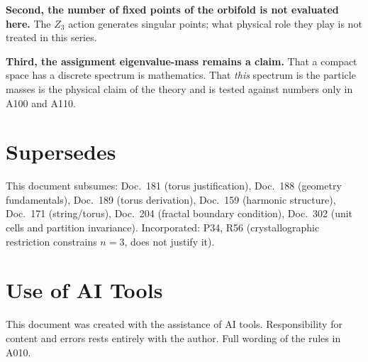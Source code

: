 \textbf{Second, the number of fixed points of the orbifold is not evaluated
here.} The $Z_3$ action generates singular points; what physical role they
play is not treated in this series.

\textbf{Third, the assignment eigenvalue-mass remains a claim.} That a compact
space has a discrete spectrum is mathematics. That \emph{this} spectrum is the
particle masses is the physical claim of the theory and is tested against
numbers only in A100 and A110.

\section{Supersedes}

This document subsumes: Doc.~181 (torus justification), Doc.~188 (geometry
fundamentals), Doc.~189 (torus derivation), Doc.~159 (harmonic structure),
Doc.~171 (string/torus), Doc.~204 (fractal boundary condition), Doc.~302
(unit cells and partition invariance). Incorporated: P34, R56 (crystallographic
restriction constrains $n=3$, does not justify it).

\section{Use of AI Tools}

This document was created with the assistance of AI tools.
Responsibility for content and errors rests entirely with the author.
Full wording of the rules in A010.
